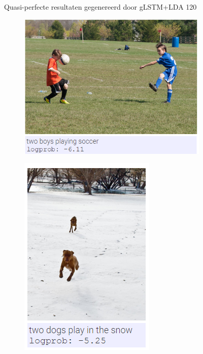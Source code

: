 \begin{figure}
\begin{subfigure}{.5\textwidth}
			\label{fig:perfectresults4}
		\end{subfigure}				
		
		\caption{Quasi-perfecte resultaten gegenereerd door gLSTM+LDA 120}
		\label{fig:perfectresults}
	\end{figure}
	
		\begin{figure}
			\begin{subfigure}{.5\textwidth}
				\centering
				\includegraphics[width=.8\linewidth]{Images/Results/Perfect/playing_soccer}
				\label{fig:perfectresults5}
			\end{subfigure}%
			\begin{subfigure}{.5\textwidth}
				\centering
				 \includegraphics[width=.8\linewidth]{Images/Results/Perfect/two_dogs_in_snow}

\end{subfigure}
\end{figure}

